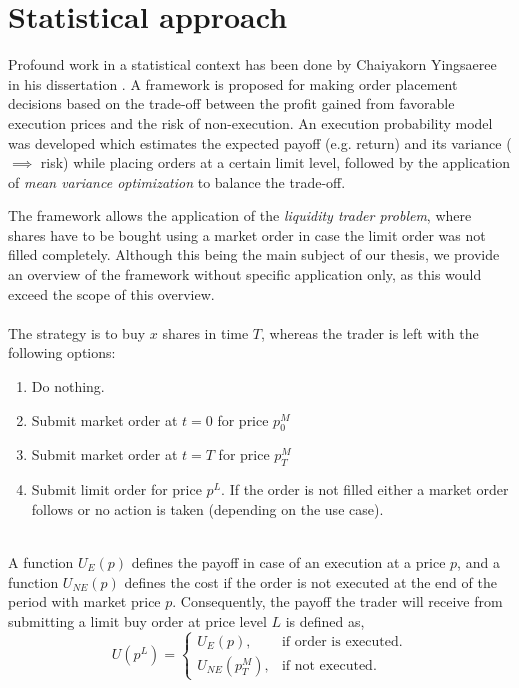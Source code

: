 \section{Statistical approach}

Profound work in a statistical context has been done by Chaiyakorn Yingsaeree in his dissertation \cite{yingsaeree2012algorithmic}.
A framework is proposed for making order placement decisions based on the trade-off between the profit gained from favorable execution prices and the risk of non-execution.
An execution probability model was developed which estimates the expected payoff (e.g. return) and its variance ($\implies$ risk) while placing orders at a certain limit level, followed by the application of \textit{mean variance optimization} to balance the trade-off.

The framework allows the application of the \textit{liquidity trader problem}, where shares have to be bought using a market order in case the limit order was not filled completely. 
Although this being the main subject of our thesis, we provide an overview of the framework without specific application only, as this would exceed the scope of this overview.
\\
\\
The strategy is to buy $x$ shares in time $T$, whereas the trader is left with the following options:
\begin{enumerate}
    \item Do nothing.
    \item Submit market order at $t=0$ for price $p_{0}^M$
    \item Submit market order at $t=T$ for price $p_{T}^M$
    \item Submit limit order for price $p^L$. If the order is not filled either a market order follows or no action is taken (depending on the use case).
\end{enumerate}
\hfill
\\
A function $U_{E}(p)$ defines the payoff in case of an execution at a price $p$, and a function $U_{NE}(p)$ defines the cost if the order is not executed at the end of the period with market price $p$. 
Consequently, the payoff the trader will receive from submitting a limit buy order at price level $L$ is defined as,
\begin{equation}
    U(p^L) = \begin{cases}
                U_E(p), & \text{if order is executed}.\\
                U_{NE}(p_T^M), & \text{if not executed}.
             \end{cases}
\end{equation}
